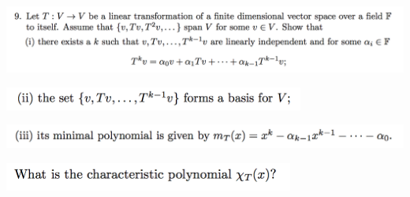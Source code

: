 \documentclass[12pt]{article}
\begin{document}
\subsection*{} %
\begin{mdframed}
\includegraphics[width=400pt]{img/linear-algebra-a0-1-9-a.png}\\
\end{mdframed}
\begin{mdframed}
\includegraphics[width=280pt]{img/linear-algebra-a0-1-9-b.png}\\
\end{mdframed}
\begin{mdframed}
\includegraphics[width=400pt]{img/linear-algebra-a0-1-9-c.png}\\
\end{mdframed}
\begin{mdframed}
\includegraphics[width=270pt]{img/linear-algebra-a0-1-9-d.png}\\
\end{mdframed}
\end{document}
